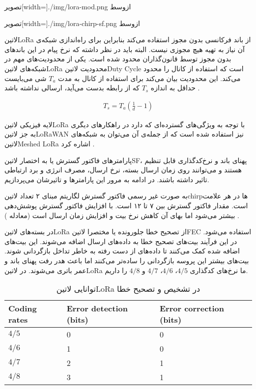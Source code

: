 ‌تصویر[width=\textwidth]{./img/lora-mod.png}
‌ازوسط

‌تصویر[width=\textwidth]{./img/lora-chirp-sf.png}
‌ازوسط

‌لاتین{LoRa} از باند فرکانسی بدون مجوز استفاده می‌کند بنابراین برای راه‌اندازی شبکه‌ی آن نیاز به تهیه هیچ مجوزی نیست. البته باید در نظر داشته که نرخ پیام در این باندهای بدون مجوز توسط قانون‌گذاران محدود شده است.
یکی از محدودیت‌های مهم در شبکه‌های ‌لاتین{LoRa} محدودیت ‌لاتین{Duty Cycle} است که استفاده از کانال را محدود می‌کند. این محدودیت بیان می‌کند برای استفاده از کانال به مدت $T_{a}$ شی می‌بایست
حداقل به اندازه $T_{s}$ که از رابطه  بدست می‌آید، ارسالی نداشته باشد
.

\begin{align}
  \label{معادله: چرخه وظیفه}
  T_{s} = T_{a}\left( \frac{1}{d} - 1 \right)
\end{align}

لایه فیزیکی ‌لاتین{LoRa} با توجه به ویژگی‌های گسترده‌ای که دارد در راهکارهای دیگری به جز ‌لاتین{LoRaWAN} نیز استفاده شده است که از جمله‌ی آن می‌توان به
شبکه‌های ‌لاتین{Meshed LoRa} اشاره کرد
.

پارامترهای فاکتور گسترش یا به اختصار ‌لاتین{SF}، پهنای باند و نرخ‌کدگذاری قابل تنظیم هستند و می‌توانند روی زمان ارسال بسته، نرخ ارسال، مصرف انرژی و برد ارتباطی تاثیر داشته باشند.
در ادامه به مرور این پارامترها و تاثیرشان می‌پردازیم.

به صورت غیر رسمی فاکتور گسترش لگاریتم مبنای ۲ تعداد ‌لاتین{chirp}ها در هر علامت است. مقدار فاکتور گسترش بین ۷ تا ۱۲ است.
با افزایش فاکتور گسترش پوشش‌دهی بیشتر می‌شود اما بهای آن کاهش نرخ بیت و افزایش زمان ارسال است (معادله )
.

در بسته‌های ‌لاتین{LoRa} از تصحیح خطا جلورونده یا مختصرا ‌لاتین{FEC} استفاده می‌شود.
در این فرآیند بیت‌های تصحیح خطا به داده‌های ارسال اضافه می‌شوند.
این بیت‌های اضافه شده کمک می‌کنند تا داده‌های از دست رفته به خاطر تداخل بازگردانی شوند.
بیت‌های بیشتر این پروسه بازگردانی را ساده‌تر می‌کنند اما باعث هدر رفت پهنای باند و عمر باتری می‌شوند.
در ‌لاتین{LoRa} ما نرخ‌های کدگذاری $4/5$، $4/6$، $4/7$ و $4/8$ را داریم.

\begin{table}
\caption{توانایی ‌لاتین{LoRa} در تشخیص و تصحیح خطا }
\begin{latin}\begin{tabularx}
  {\textwidth}
  {|*{3}{X|}}
  \toprule
  Coding rates &
  Error detection (bits) &
  Error correction (bits) \\
  \midrule
  $4/5$ &
  0 &
  0 \\
  \midrule
  $4/6$ &
  1 &
  0 \\
  \midrule
  $4/7$ &
  2 &
  1 \\
  \midrule
  $4/8$ &
  3 &
  1 \\
  \bottomrule
\end{tabularx}\end{latin}
\end{table}

